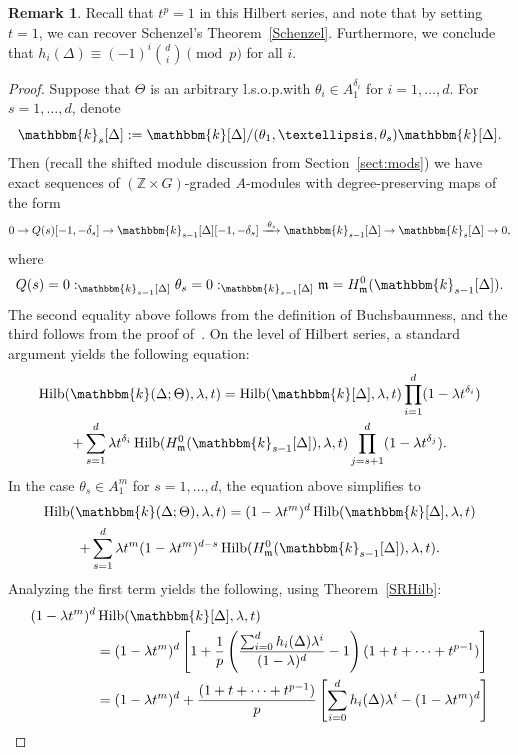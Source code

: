 \documentclass[10pt]{amsart}
\theoremstyle{definition}
\newtheorem{rema}[theo]{Remark}
\DeclareMathOperator{\Hilb}{Hilb}
\newcommand{\field}{\mathbbm{k}}
\newcommand{\ZZ}{{\mathbb Z}}
\newcommand{\mideal}{\ensuremath{\mathfrak{m}}}
\begin{document}
\begin{rema}
Recall that $t^p=1$ in this Hilbert series, and note that by setting $t=1$, we can recover Schenzel's Theorem~\ref{Schenzel}. Furthermore, we conclude that $h_i(\Delta) \equiv (-1)^i\binom{d}{i} \pmod p$ for all $i$.
\end{rema}

\begin{proof}
Suppose that $\Theta$ is an arbitrary l.s.o.p.\@ with $\theta_i\in A_1^{\delta_i}$ for $i=1, \ldots, d$. For $s=1, \ldots, d$, denote
\[
\field_s[\Delta]:=\field[\Delta]/(\theta_1, \ldots, \theta_s)\field[\Delta].
\]
Then (recall the shifted module discussion from Section~\ref{sect:mods}) we have exact sequences of $(\ZZ\times G)$-graded $A$-modules with degree-preserving maps of the form
\[
0\to Q(s)[-1, -\delta_s]\to \field_{s-1}[\Delta][-1, -\delta_s]\xrightarrow{\cdot\theta_s} \field_{s-1}[\Delta]\to \field_s[\Delta]\to 0,
\]
where
\[
Q(s)=0:_{\field_{s-1}[\Delta]}\theta_s=0:_{\field_{s-1}[\Delta]}\mideal = H_\mideal^0(\field_{s-1}[\Delta]).
\]
The second equality above follows from the definition of Buchsbaumness, and the third follows from the proof of~\cite[Proposition~I.2.1]{StVo}. On the level of Hilbert series, a standard argument yields the following equation:
\begin{multline*}
\Hilb(\field(\Delta; \Theta), \lambda, t)=\Hilb(\field[\Delta], \lambda, t)\prod_{i=1}^d(1-\lambda t^{\delta_i})\\+\sum_{s=1}^d\lambda t^{\delta_i}\Hilb(H_\mideal^0(\field_{s-1}[\Delta]), \lambda, t)\prod_{j=s+1}^d(1-\lambda t^{\delta_j}).
\end{multline*}
In the case $\theta_s\in A_1^m$ for $s=1, \ldots, d$, the equation above simplifies to
\begin{multline*}
\Hilb(\field(\Delta; \Theta), \lambda, t)=(1-\lambda t^m)^d\Hilb(\field[\Delta], \lambda, t)\\+\sum_{s=1}^d\lambda t^m(1-\lambda t^m)^{d-s}\Hilb(H_\mideal^0(\field_{s-1}[\Delta]), \lambda, t).
\end{multline*}
Analyzing the first term yields the following, using Theorem~\ref{SRHilb}:
\begin{align*}
(1-\lambda t^m)^d&\Hilb(\field[\Delta], \lambda, t)\\
&=(1-\lambda t^m)^d\left[1+\frac{1}{p}\left(\frac{\sum_{i=0}^d h_i(\Delta)\lambda^i}{(1-\lambda)^d}-1\right)(1+t+\cdots+t^{p-1})\right]\\
&=(1-\lambda t^m)^d+\frac{(1+t+\cdots+t^{p-1})}{p}\left[\sum_{i=0}^dh_i(\Delta)\lambda^i - (1-\lambda t^m)^d\right]\\

\end{align*}
\end{proof}
\end{document}
